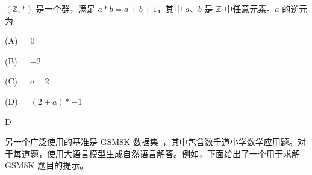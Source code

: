 \vspace{0.5em}
\begin{tcolorbox}

\begingroup
\setlength{\leftskip}{2em}
\setlength{\rightskip}{2em}

$(\mathbb{Z},*)$ 是一个群，满足 $a*b = a+b+1$，其中 $a$、$b$ 是 $\mathbb{Z}$ 中任意元素。$a$ 的逆元为

\vspace{0.5em}

(A)\ \ \ $0$

\vspace{0.3em}

(B)\ \ \ $-2$

\vspace{0.3em}

(C)\ \ \ $a-2$

\vspace{0.3em}

(D)\ \ \ $(2+a)*-1$

\vspace{0.5em}

\underline{D}

\endgroup

\end{tcolorbox}
\vspace{0.5em}

另一个广泛使用的基准是 GSM8K 数据集~\cite{cobbe-etal:2021training}，其中包含数千道小学数学应用题。对于每道题，使用大语言模型生成自然语言解答。例如，下面给出了一个用于求解 GSM8K 题目的提示。

